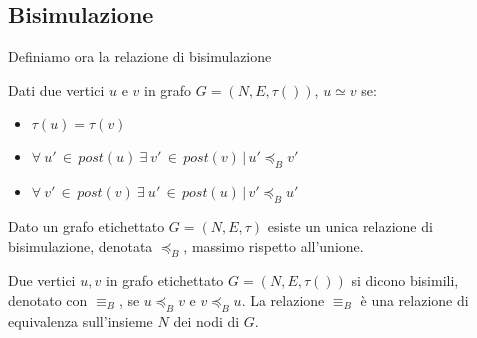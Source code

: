 \subsection{Bisimulazione}
Definiamo ora la relazione di bisimulazione
\begin{definition}
Dati due vertici $u$ e $v$ in grafo $G = (N,E,\tau())$, $u \simeq v$ se:
\begin{itemize}
\item $\tau(u) = \tau(v)$
\item $\forall\:u'\,\in\,post(u)\:\exists\:v'\,\in\,post(v)\,|\,u' \preceq_B v'$
\item $\forall\:v'\,\in\,post(v)\:\exists\:u'\,\in\,post(u)\,|\,v' \preceq_B u'$
\end{itemize}
\begin{lemma}
Dato un grafo etichettato $G = (N,E,\tau)$ esiste un unica relazione di bisimulazione, denotata $\preceq_B$, massimo rispetto all'unione.
\end{lemma}
\end{definition}
\begin{definition}
Due vertici $u,v$ in grafo etichettato $G = (N,E,\tau())$ si dicono bisimili, denotato con $\equiv_B$, se $u\preceq_Bv$ e $v\preceq_Bu$. La relazione $\equiv_B$ è una relazione di equivalenza sull'insieme $N$ dei nodi di $G$.
\end{definition}


